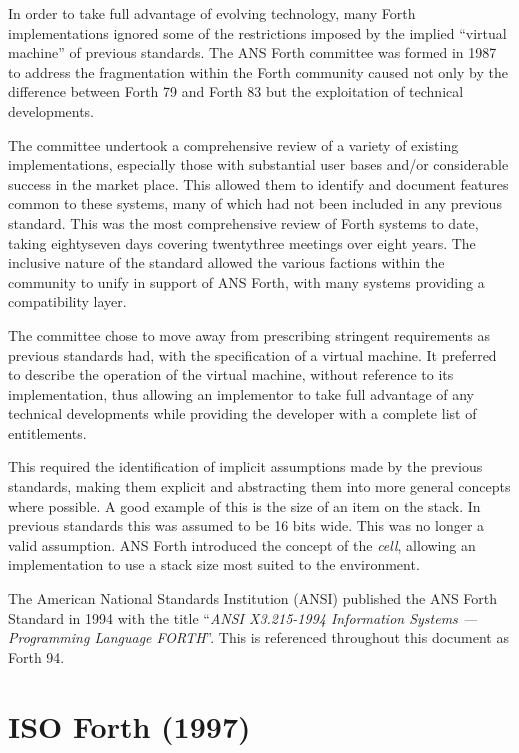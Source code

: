 In order to take full advantage of evolving technology, many Forth
implementations ignored some of the restrictions imposed by the
implied ``virtual machine'' of previous standards.
The ANS Forth committee was formed in 1987 to address the fragmentation
within the Forth community caused not only by the difference between
Forth 79 and Forth 83 but the exploitation of technical developments.

The committee undertook a comprehensive review of a variety of existing
implementations, especially those with substantial user bases and/or
considerable success in the market place.  This allowed them to identify
and document features common to these systems, many of which had not been
included in any previous standard.
This was the most comprehensive review of Forth systems to date, taking
eightyseven days covering twentythree meetings over eight years.
The inclusive nature of the standard allowed the various factions within
the community to unify in support of ANS Forth, with many systems
providing a compatibility layer.


The committee chose to move away from prescribing stringent requirements
as previous standards had, with the specification of a virtual machine.
It preferred to describe the operation of the virtual machine, without
reference to its implementation, thus allowing an implementor to take
full advantage of any technical developments while providing the
developer with a complete list of entitlements.

This required the identification of implicit assumptions made by the
previous standards, making them explicit and abstracting them into
more general concepts where possible.  A good example of this is the
size of an item on the stack.  In previous standards this was assumed
to be 16 bits wide.  This was no longer a valid assumption.  ANS Forth
introduced the concept of the \emph{cell}, allowing an implementation
to use a stack size most suited to the environment.

The American National Standards Institution (ANSI) published the ANS
Forth Standard in 1994 with the title ``\emph{ANSI X3.215-1994
Information Systems --- Programming Language FORTH}''.  This is referenced
throughout this document as Forth 94.

\section{ISO Forth (1997)}
\label{diff:iso}

